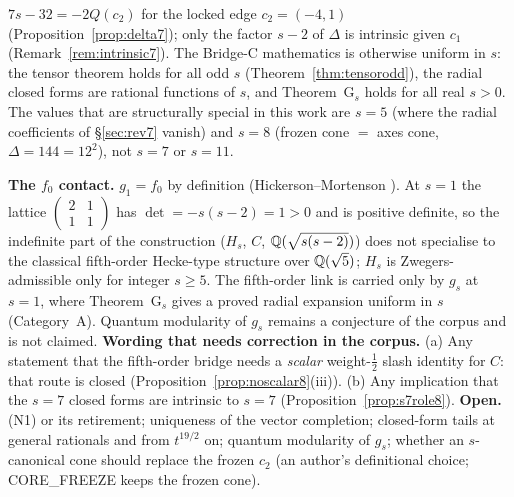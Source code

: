 \begin{proposition}[The role of $s=7$ comes from the frozen $c_2$]\label{prop:s7role8}
$7s-32=-2Q(c_2)$ for the locked edge $c_2=(-4,1)$ (Proposition~\ref{prop:delta7}); only the factor $s-2$ of $\Delta$ is intrinsic given $c_1$ (Remark~\ref{rem:intrinsic7}). The Bridge-C mathematics is otherwise uniform in $s$: the tensor theorem holds for all odd $s$ (Theorem~\ref{thm:tensorodd}), the radial closed forms are rational functions of $s$, and Theorem~G$_s$ holds for all real $s>0$. The values that are structurally special in this work are $s=5$ (where the radial coefficients of \S\ref{sec:rev7} vanish) and $s=8$ (frozen cone $=$ axes cone, $\Delta=144=12^2$), not $s=7$ or $s=11$.
\end{proposition}

\noindent\textbf{The $f_0$ contact.} $g_1=f_0$ by definition (Hickerson--Mortenson \cite{HM}). At $s=1$ the lattice $\left(\begin{smallmatrix}2&1\\1&1\end{smallmatrix}\right)$ has $\det=-s(s-2)=1>0$ and is positive definite, so the indefinite part of the construction ($H_s$, $C$, $\mathbb{Q}(\sqrt{s(s-2)})$) does not specialise to the classical fifth-order Hecke-type structure over $\mathbb{Q}(\sqrt5)$; $H_s$ is Zwegers-admissible only for integer $s\ge5$. The fifth-order link is carried only by $g_s$ at $s=1$, where Theorem~G$_s$ gives a proved radial expansion uniform in $s$ (Category~A). Quantum modularity of $g_s$ remains a conjecture of the corpus and is not claimed.
\noindent\textbf{Wording that needs correction in the corpus.} (a) Any statement that the fifth-order bridge needs a \emph{scalar} weight-$\tfrac12$ slash identity for $C$: that route is closed (Proposition~\ref{prop:noscalar8}(iii)). (b) Any implication that the $s=7$ closed forms are intrinsic to $s=7$ (Proposition~\ref{prop:s7role8}).
\noindent\textbf{Open.} \textsf{(N1)} or its retirement; uniqueness of the vector completion; closed-form tails at general rationals and from $t^{19/2}$ on; quantum modularity of $g_s$; whether an $s$-canonical cone should replace the frozen $c_2$ (an author's definitional choice; CORE\_FREEZE keeps the frozen cone).


